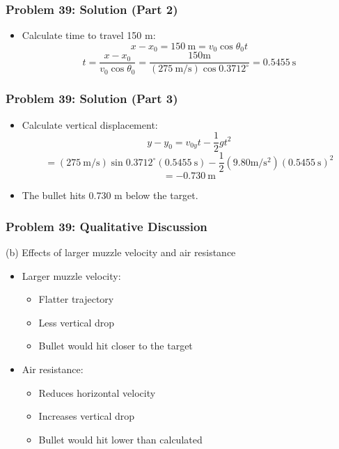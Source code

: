 \documentclass{beamer}
\begin{document}
\begin{frame}
\frametitle{Problem 39: Solution (Part 2)}
\begin{itemize}
    \item Calculate time to travel 150 m:
    $$x-x_{0}=150 \mathrm{~m}=v_{0} \cos \theta_{0} t$$
    $$t=\frac{x-x_{0}}{v_{0} \cos \theta_{0}}=\frac{150 \mathrm{m}}{(275 \mathrm{~m} / \mathrm{s}) \cos 0.3712^{\circ}}=0.5455 \mathrm{~s}$$
\end{itemize}
\end{frame}

\begin{frame}
\frametitle{Problem 39: Solution (Part 3)}
\begin{itemize}
    \item Calculate vertical displacement:
    $$y-y_{0}=v_{0y} t-\frac{1}{2} g t^{2}$$
    $$=(275 \mathrm{~m} / \mathrm{s}) \sin 0.3712^{\circ}(0.5455 \mathrm{~s})-\frac{1}{2}(9.80 \mathrm{m} / \mathrm{s}^{2})(0.5455 \mathrm{~s})^2$$
    $$=-0.730 \mathrm{~m}$$
    \item The bullet hits 0.730 m below the target.
\end{itemize}
\end{frame}

\begin{frame}
\frametitle{Problem 39: Qualitative Discussion}
\begin{block}{(b) Effects of larger muzzle velocity and air resistance}
\begin{itemize}
    \item Larger muzzle velocity:
    \begin{itemize}
        \item Flatter trajectory
        \item Less vertical drop
        \item Bullet would hit closer to the target
    \end{itemize}
    \item Air resistance:
    \begin{itemize}
        \item Reduces horizontal velocity
        \item Increases vertical drop
        \item Bullet would hit lower than calculated
    \end{itemize}
\end{itemize}
\end{block}
\end{frame}
\end{document}
